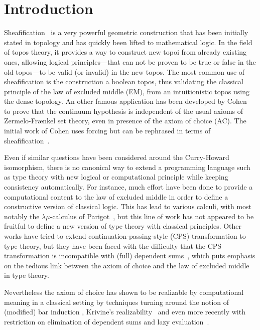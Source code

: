 \documentclass[conference]{IEEEtran}
\begin{document}

\section{Introduction}
\label{sec:intro}

Sheafification~\cite{maclanemoerdijk} is a very powerful geometric
construction that has been initially stated in topology and has
quickly been lifted to mathematical logic.
%
In the field of topos theory, it provides a way to construct new topoi
from already existing ones, allowing logical principles---that can not
be proven to be true or false in the old topos---to be valid (or
invalid) in the new topos.
%
The most common use of sheafification is the construction a boolean
topos, thus validating the classical principle of the law of excluded
middle (EM), from an intuitionistic topos using the dense topology. 
%
An other famous application has been developed by
Cohen~\cite{cohen1966} to prove that the continuum hypothesis is
independent of the usual axioms of Zermelo-Fr\ae nkel set theory, even
in presence of the axiom of choice (AC). The initial work of Cohen
uses forcing but can be rephrased in terms of
sheafification~\cite{maclanemoerdijk}.

Even if similar questions have been considered around the Curry-Howard
isomorphism, there is no canonical way to extend a programming
language such as type theory with new logical or computational
principle while keeping consistency automatically.
%
For instance, much effort have been done to provide a computational
content to the law of excluded middle in order to define a
constructive version of classical logic. This has lead to various
calculi, with most notably the $\lambda \mu$-calculus of
Parigot~\cite{parigot1993classical}, but this line of work has not
appeared to be fruitful to define a new version of type theory with
classical principles.
%
Other works have tried to extend continuation-passing-style (CPS)
transformation to type theory, but they have been faced with the
difficulty that the CPS transformation is incompatible with (full) dependent
sums~\cite{barthe2002cps}, which puts emphasis on the tedious link
between the axiom of choice and the law of excluded middle in type theory.

Nevertheless the axiom of choice has shown to be realizable by
computational meaning in a classical setting by techniques turning
around the notion of (modified) bar induction
\cite{berardi1998computational}, Krivine's
realizability~\cite{krivine2003dependent} and even more recently with
restriction on elimination of dependent sums and lazy
evaluation~\cite{herbelin2012constructive}.
%
\end{document}
